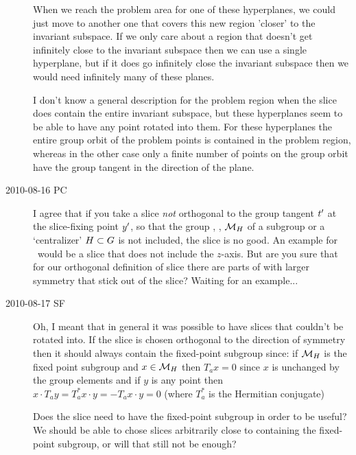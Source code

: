 \begin{description}
When we reach the problem area for one of these hyperplanes,
we could just move to another one that covers this new region
'closer' to the invariant subspace. If we only care about a
region that doesn't get infinitely close to the invariant
subspace then we can use a single hyperplane, but if it does
go infinitely close the invariant subspace then we would need
infinitely many of these planes.

I don't know a general description for the problem region
when the slice does contain the entire invariant subspace,
but these hyperplanes seem to be able to have any point
rotated into them. For these hyperplanes the entire group
orbit of the problem points is contained in the problem
region, whereas in the other case only a finite number of
points on the group orbit have the group tangent in the
direction of the plane.

\item[2010-08-16 PC]
I agree that if you take a slice \emph{not} orthogonal to the group
tangent $t'_{}$ at the slice-fixing point ${y'}$,
so that the group {\fixedsp}, \ie,
${\cal M}_H$ of a subgroup or a `centralizer' $H \subset G$
 is not included, the slice is no
good. An example for \cLe\ would be a slice
that does not include the $z$-axis.
But are you sure that for our orthogonal definition
of slice there are parts of {\statesp} with larger symmetry
that stick out of the slice? Waiting for an example...

\item[2010-08-17 SF]
Oh, I meant that in general it was possible to have slices that couldn't be rotated into. If the slice is chosen orthogonal to the direction of symmetry then it should always contain the fixed-point subgroup since: if ${\cal M}_H$ is the fixed point subgroup and $x \in {\cal M}_H$ then $T_a x=0$ since $x$ is unchanged by the group elements and if $y$ is any point then $x \cdot T_a y=T_a^* x \cdot y=-T_a x \cdot y=0$ (where $T_a^*$ is the Hermitian conjugate)

Does the slice need to have the fixed-point subgroup in order to be useful? We should be able to chose slices arbitrarily close to containing the fixed-point subgroup, or will that still not be enough?


\end{description}
